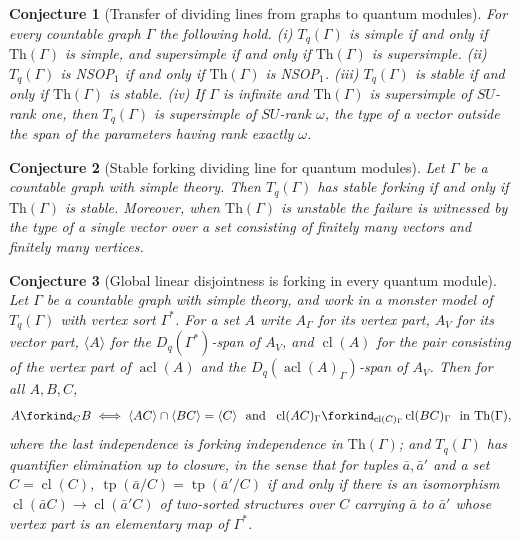 \documentclass[11pt]{article}
\newtheorem{conjecture}{Conjecture}
\theoremstyle{definition}
\begin{document}
\begin{conjecture}[Transfer of dividing lines from graphs to quantum modules]\label{au5}
For every countable graph $\Gamma$ the following hold.
{\rm(i)} $T_q(\Gamma)$ is simple if and only if $\mathrm{Th}(\Gamma)$ is
simple, and supersimple if and only if $\mathrm{Th}(\Gamma)$ is supersimple.
{\rm(ii)} $T_q(\Gamma)$ is NSOP$_1$ if and only if $\mathrm{Th}(\Gamma)$ is
NSOP$_1$.
{\rm(iii)} $T_q(\Gamma)$ is stable if and only if $\mathrm{Th}(\Gamma)$ is
stable.
{\rm(iv)} If $\Gamma$ is infinite and $\mathrm{Th}(\Gamma)$ is supersimple
of $SU$-rank one, then $T_q(\Gamma)$ is supersimple of $SU$-rank $\omega$,
the type of a vector outside the span of the parameters having rank
exactly $\omega$.
\end{conjecture}


\begin{conjecture}[Stable forking dividing line for quantum modules]\label{au6}
Let $\Gamma$ be a countable graph with simple theory.  Then $T_q(\Gamma)$
has stable forking if and only if $\mathrm{Th}(\Gamma)$ is stable.
Moreover, when $\mathrm{Th}(\Gamma)$ is unstable the failure is witnessed by
the type of a single vector over a set consisting of finitely many vectors
and finitely many vertices.
\end{conjecture}


\begin{conjecture}[Global linear disjointness is forking in every quantum module]\label{au7}
Let $\Gamma$ be a countable graph with simple theory, and work in a
monster model of $T_q(\Gamma)$ with vertex sort $\Gamma^*$.  For a set $A$
write $A_\Gamma$ for its vertex part, $A_V$ for its vector part,
$\langle A\rangle$ for the $D_q(\Gamma^*)$-span of $A_V$, and
$\operatorname{cl}(A)$ for the pair consisting of the vertex part of
$\operatorname{acl}(A)$ and the $D_q(\operatorname{acl}(A)_\Gamma)$-span of
$A_V$.  Then for all $A,B,C$,
\[
 A\forkind_C B
 \iff
 \langle AC\rangle\cap\langle BC\rangle=\langle C\rangle
 \ \text{ and }\ 
 \operatorname{cl}(AC)_\Gamma\forkind_{\operatorname{cl}(C)_\Gamma}\operatorname{cl}(BC)_\Gamma
 \ \text{ in }\mathrm{Th}(\Gamma),
\]
where the last independence is forking independence in $\mathrm{Th}(\Gamma)$;
and $T_q(\Gamma)$ has quantifier elimination up to closure, in the sense
that for tuples $\bar a,\bar a'$ and a set $C=\operatorname{cl}(C)$,
$\operatorname{tp}(\bar a/C)=\operatorname{tp}(\bar a'/C)$ if and only if
there is an isomorphism $\operatorname{cl}(\bar aC)\to\operatorname{cl}(\bar a'C)$
of two-sorted structures over $C$ carrying $\bar a$ to $\bar a'$ whose
vertex part is an elementary map of $\Gamma^*$.
\end{conjecture}
\end{document}
